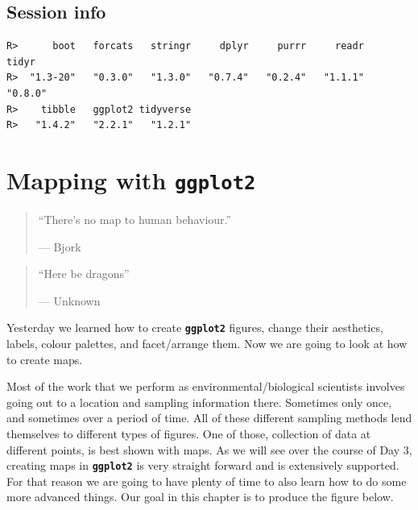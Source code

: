 \documentclass[]{book}
\newenvironment{Shaded}{\begin{snugshade}}{\end{snugshade}}
\newcommand{\KeywordTok}[1]{\textcolor[rgb]{0.13,0.29,0.53}{\textbf{#1}}}
\newcommand{\StringTok}[1]{\textcolor[rgb]{0.31,0.60,0.02}{#1}}
\newcommand{\OperatorTok}[1]{\textcolor[rgb]{0.81,0.36,0.00}{\textbf{#1}}}
\newcommand{\NormalTok}[1]{#1}
\theoremstyle{definition}
\theoremstyle{definition}
\theoremstyle{definition}
\theoremstyle{remark}
\begin{document}
\section{Session info}\label{session-info-5}

\begin{Shaded}
\end{Shaded}

\begin{verbatim}
R>      boot   forcats   stringr     dplyr     purrr     readr     tidyr 
R>  "1.3-20"   "0.3.0"   "1.3.0"   "0.7.4"   "0.2.4"   "1.1.1"   "0.8.0" 
R>    tibble   ggplot2 tidyverse 
R>   "1.4.2"   "2.2.1"   "1.2.1"
\end{verbatim}

\chapter{\texorpdfstring{Mapping with
\textbf{\texttt{ggplot2}}}{Mapping with ggplot2}}\label{mapping}

\begin{quote}
``There's no map to human behaviour.''

--- Bjork
\end{quote}

\begin{quote}
``Here be dragons''

--- Unknown
\end{quote}

Yesterday we learned how to create \textbf{\texttt{ggplot2}} figures,
change their aesthetics, labels, colour palettes, and facet/arrange
them. Now we are going to look at how to create maps.

Most of the work that we perform as environmental/biological scientists
involves going out to a location and sampling information there.
Sometimes only once, and sometimes over a period of time. All of these
different sampling methods lend themselves to different types of
figures. One of those, collection of data at different points, is best
shown with maps. As we will see over the course of Day 3, creating maps
in \textbf{\texttt{ggplot2}} is very straight forward and is extensively
supported. For that reason we are going to have plenty of time to also
learn how to do some more advanced things. Our goal in this chapter is
to produce the figure below.
\end{document}
